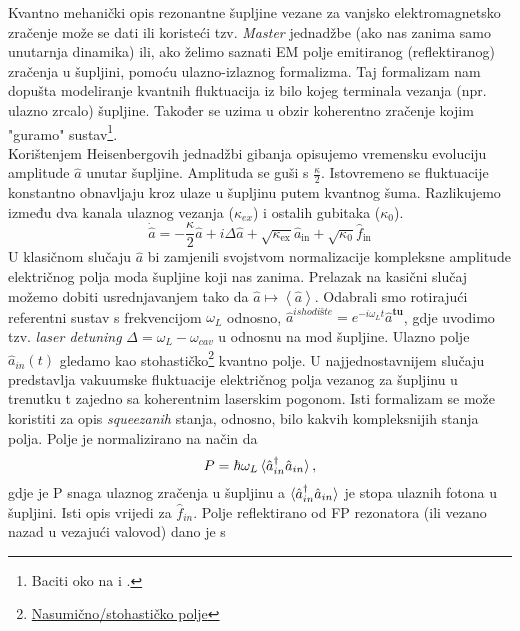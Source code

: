 Kvantno mehanički opis rezonantne šupljine vezane za vanjsko elektromagnetsko zračenje može se dati ili koristeći tzv. \textit{Master} jednadžbe (ako nas
zanima samo unutarnja dinamika) ili, ako želimo saznati EM polje emitiranog (reflektiranog) zračenja u šupljini, pomoću ulazno-izlaznog formalizma. 
Taj formalizam nam dopušta modeliranje kvantnih fluktuacija iz bilo kojeg terminala vezanja (npr. ulazno zrcalo) šupljine. Također se uzima u obzir koherentno
zračenje kojim "guramo" sustav\footnote{Baciti oko na \cite{gardiner_zoller_2004} i \cite{clerk_devoret_girvin_marquardt_schoelkopf_2010}.}.\\
Korištenjem Heisenbergovih jednadžbi gibanja opisujemo vremensku evoluciju amplitude $\hat{a}$ unutar šupljine. Amplituda se guši s $\frac{\kappa}{2}$. Istovremeno
se fluktuacije konstantno obnavljaju kroz ulaze u šupljinu putem kvantnog šuma. Razlikujemo između dva kanala ulaznog vezanja ($\kappa_{ex}$) i ostalih gubitaka ($\kappa_0$).
\begin{equation}
\dot{\hat{a}}=-\frac{\kappa}{2} \hat{a}+i \Delta \hat{a}+\sqrt{\kappa_{\mathrm{ex}}} \hat{a}_{\mathrm{in}}+\sqrt{\kappa_0} \hat{f}_{\mathrm{in}}
\label{eq:1}
\end{equation}
U klasičnom slučaju $\hat{a}$ bi zamjenili svojstvom normalizacije kompleksne amplitude električnog polja moda šupljine koji nas zanima. 
Prelazak na kasični slučaj možemo dobiti usrednjavanjem tako da $\hat{a} \mapsto \left<\hat{a}\right>$. Odabrali smo rotirajući referentni sustav s frekvencijom $\omega_L$ odnosno,
$\hat{a}^{ishodište} = e^{-i\omega_L t}\hat{a}^{\textbf{tu}}$, gdje uvodimo tzv. \textit{laser detuning} $\Delta = \omega_L - \omega_{cav}$ u odnosnu na mod šupljine. 
Ulazno polje $\hat{a}_{in}(t)$ gledamo kao stohastičko\footnote{\href{https://en.wikipedia.org/wiki/Random_field}{Nasumično/stohastičko polje}} kvantno polje. U najjednostavnijem slučaju predstavlja vakuumske fluktuacije 
električnog polja vezanog za šupljinu u trenutku t zajedno sa koherentnim laserskim pogonom. Isti formalizam se može koristiti za opis \textit{squeezanih} stanja, odnosno, bilo kakvih kompleksnijih stanja polja. 
Polje je normalizirano na način da 
\begin{equation}
	P = \hbar \omega_L \braket{\hat{a}_{in}^{\dagger}\hat{a}_{in}},
	\label{eq:2}
\end{equation}
gdje je P snaga ulaznog zračenja u šupljinu a $\braket{\hat{a}_{in}^{\dagger}\hat{a}_{in}}$ je stopa ulaznih fotona u šupljini. Isti opis vrijedi za $\hat{f}_{in}$.
Polje reflektirano od FP rezonatora (ili vezano nazad u vezajući valovod) dano je s 
